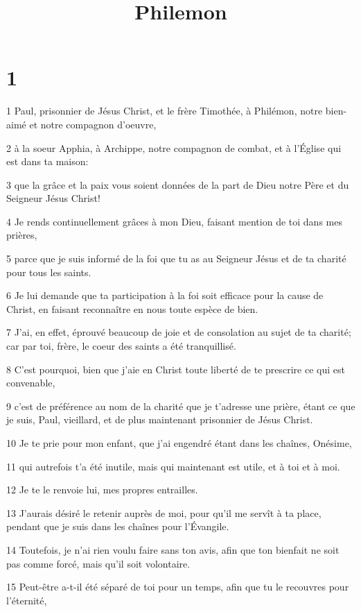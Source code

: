 

\title{Philemon}


\chapter{1}

\par 1 Paul, prisonnier de Jésus Christ, et le frère Timothée, à Philémon, notre bien-aimé et notre compagnon d'oeuvre,
\par 2 à la soeur Apphia, à Archippe, notre compagnon de combat, et à l'Église qui est dans ta maison:
\par 3 que la grâce et la paix vous soient données de la part de Dieu notre Père et du Seigneur Jésus Christ!
\par 4 Je rends continuellement grâces à mon Dieu, faisant mention de toi dans mes prières,
\par 5 parce que je suis informé de la foi que tu as au Seigneur Jésus et de ta charité pour tous les saints.
\par 6 Je lui demande que ta participation à la foi soit efficace pour la cause de Christ, en faisant reconnaître en nous toute espèce de bien.
\par 7 J'ai, en effet, éprouvé beaucoup de joie et de consolation au sujet de ta charité; car par toi, frère, le coeur des saints a été tranquillisé.
\par 8 C'est pourquoi, bien que j'aie en Christ toute liberté de te prescrire ce qui est convenable,
\par 9 c'est de préférence au nom de la charité que je t'adresse une prière, étant ce que je suis, Paul, vieillard, et de plus maintenant prisonnier de Jésus Christ.
\par 10 Je te prie pour mon enfant, que j'ai engendré étant dans les chaînes, Onésime,
\par 11 qui autrefois t'a été inutile, mais qui maintenant est utile, et à toi et à moi.
\par 12 Je te le renvoie lui, mes propres entrailles.
\par 13 J'aurais désiré le retenir auprès de moi, pour qu'il me servît à ta place, pendant que je suis dans les chaînes pour l'Évangile.
\par 14 Toutefois, je n'ai rien voulu faire sans ton avis, afin que ton bienfait ne soit pas comme forcé, mais qu'il soit volontaire.
\par 15 Peut-être a-t-il été séparé de toi pour un temps, afin que tu le recouvres pour l'éternité,
